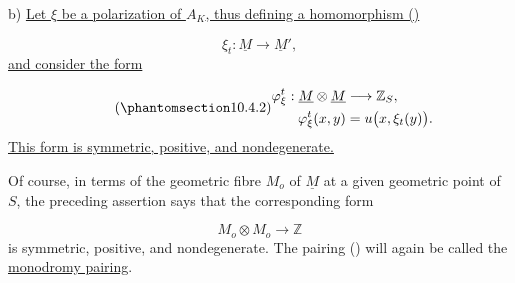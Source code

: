 \smallskip
\noindent
b) \underline{Let $\xi$ be a polarization of $A_K$, thus defining a
homomorphism ()}

\begin{equation*}
\xi_t:\underline M\longrightarrow\underline M',
\end{equation*}
\underline{and consider the form}

\begin{equation}\tag{\SGARefTarget{sga7.sga7i.eix.n10-4-2}{10.4.2}}
\begin{aligned}
\varphi_\xi^t:\underline M\otimes\underline M
  &\longrightarrow\mathbb Z_S,\\
\varphi_\xi^t(x,y)&=u\bigl(x,\xi_t(y)\bigr).
\end{aligned}
\end{equation}
\underline{This form is symmetric, positive, and nondegenerate.}

Of course, in terms of the geometric fibre $M_o$ of $\underline M$ at a
given geometric point of $S$, the preceding assertion says that the
corresponding form

\begin{equation*}
M_o\otimes M_o\longrightarrow\mathbb Z
\end{equation*}
is symmetric, positive, and nondegenerate. The pairing () will
again be called the \underline{monodromy pairing}.
